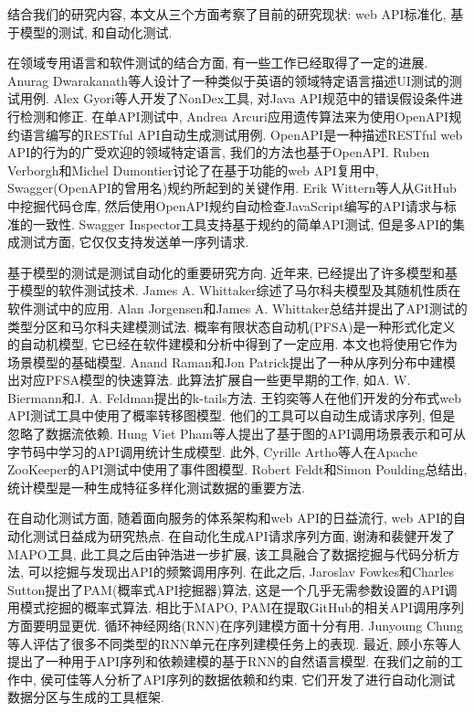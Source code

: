     	结合我们的研究内容, 本文从三个方面考察了目前的研究现状: web API标准化, 基于模型的测试, 和自动化测试.
    	
    	在领域专用语言和软件测试的结合方面, 有一些工作已经取得了一定的进展. Anurag Dwarakanath等人\cite{dwarakanatha17}设计了一种类似于英语的领域特定语言描述UI测试的测试用例. Alex Gyori等人\cite{gyoria16}开发了NonDex工具, 对Java API规范中的错误假设条件进行检测和修正. 在单API测试中, Andrea Arcuri\cite{andreaa17}应用遗传算法来为使用OpenAPI规约语言编写的RESTful API自动生成测试用例. OpenAPI\cite{openapi17}是一种描述RESTful web API的行为的广受欢迎的领域特定语言, 我们的方法也基于OpenAPI. Ruben Verborgh和Michel Dumontier\cite{verborgh2016web}讨论了在基于功能的web API复用中, Swagger(OpenAPI的曾用名)规约所起到的关键作用. Erik Wittern等人\cite{wittern2017statically}从GitHub中挖掘代码仓库, 然后使用OpenAPI规约自动检查JavaScript编写的API请求与标准的一致性. Swagger Inspector\cite{swaggerinspetor17}工具支持基于规约的简单API测试, 但是多API的集成测试方面, 它仅仅支持发送单一序列请求.
    	
    	基于模型的测试是测试自动化的重要研究方向. 近年来, 已经提出了许多模型和基于模型的软件测试技术. James A. Whittaker\cite{Whittaker1997}综述了马尔科夫模型及其随机性质在软件测试中的应用. Alan Jorgensen和James A. Whittaker\cite{jorgensen2000api}总结并提出了API测试的类型分区和马尔科夫建模测试法. 概率有限状态自动机(PFSA)\cite{enriquev05}是一种形式化定义的自动机模型, 它已经在软件建模和分析中得到了一定应用. 本文也将使用它作为场景模型的基础模型. Anand Raman和Jon Patrick\cite{anand97}提出了一种从序列分布中建模出对应PFSA模型的快速算法. 此算法扩展自一些更早期的工作, 如A. W. Biermann和J. A. Feldman提出的k-tails方法\cite{abiermann72}. 王钧奕等人\cite{junyiw17}在他们开发的分布式web API测试工具中使用了概率转移图模型. 他们的工具可以自动生成请求序列, 但是忽略了数据流依赖. Hung Viet Pham等人\cite{pham2016learning}提出了基于图的API调用场景表示和可从字节码中学习的API调用统计生成模型. 此外, Cyrille Artho等人\cite{cyrille17}在Apache ZooKeeper的API测试中使用了事件图模型. Robert Feldt和Simon Poulding\cite{feldt2017searching}总结出, 统计模型是一种生成特征多样化测试数据的重要方法.
    	
    	在自动化测试方面, 随着面向服务的体系架构和web API的日益流行, web API的自动化测试日益成为研究热点. 在自动化生成API请求序列方面, 谢涛和裴健\cite{taox06}开发了MAPO工具, 此工具之后由钟浩进一步扩展\cite{Zhong2009}, 该工具融合了数据挖掘与代码分析方法, 可以挖掘与发现出API的频繁调用序列. 在此之后, Jaroslav Fowkes和Charles Sutton\cite{fowkes2016parameter}提出了PAM(概率式API挖掘器)算法, 这是一个几乎无需参数设置的API调用模式挖掘的概率式算法. 相比于MAPO, PAM在提取GitHub的相关API调用序列方面要明显更优. 循环神经网络(RNN)在序列建模方面十分有用. Junyoung Chung等人\cite{chung2014empirical}评估了很多不同类型的RNN单元在序列建模任务上的表现. 最近, 顾小东等人\cite{xiaodongg16}提出了一种用于API序列和依赖建模的基于RNN的自然语言模型. 在我们之前的工作中, 侯可佳等人\cite{kejiah13}分析了API序列的数据依赖和约束. 它们开发了进行自动化测试数据分区与生成的工具框架. 
    	
